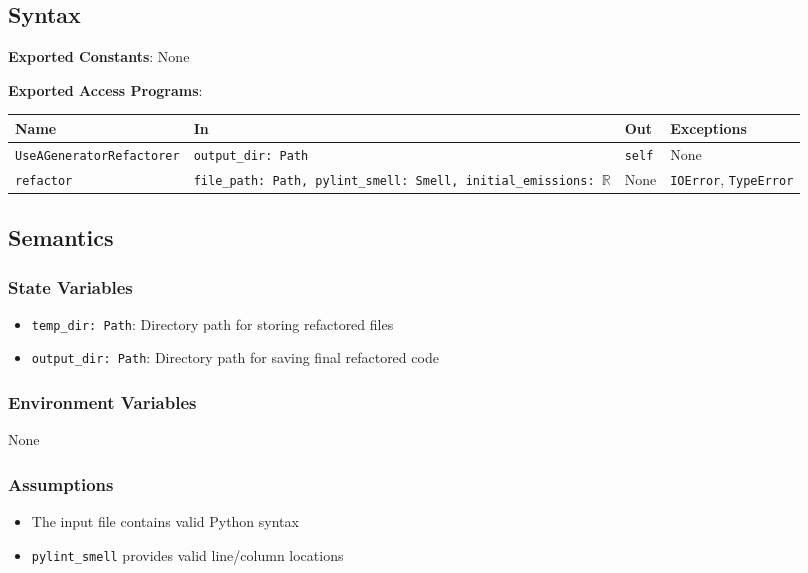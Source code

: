 \documentclass[12pt, titlepage]{article}
\begin{document}
\subsection{Syntax}
\noindent
\textbf{Exported Constants}: None


\noindent
\textbf{Exported Access Programs}:\\
\begin{tabularx}{\linewidth}{|
    l|
    >{\raggedright\arraybackslash}X|
    l|
    l|}
  \hline
  \textbf{Name} & \textbf{In} & \textbf{Out} & \textbf{Exceptions} \\\hline
  \texttt{UseAGeneratorRefactorer} & \texttt{output\_dir: Path} & \texttt{self} & None \\
  \hline
  \texttt{refactor} & \texttt{file\_path: Path, pylint\_smell: Smell, initial\_emissions: $\mathbb{R}$} & None & \texttt{IOError}, \texttt{TypeError} \\
  \hline
\end{tabularx}

\subsection{Semantics}

\subsubsection{State Variables}
\begin{itemize}
\item \texttt{temp\_dir: Path}: Directory path for storing refactored files
\item \texttt{output\_dir: Path}: Directory path for saving final refactored code
\end{itemize}

\subsubsection{Environment Variables}
None

\subsubsection{Assumptions}
\begin{itemize}
\item The input file contains valid Python syntax
\item \texttt{pylint\_smell} provides valid line/column locations
\end{itemize}
\end{document}
